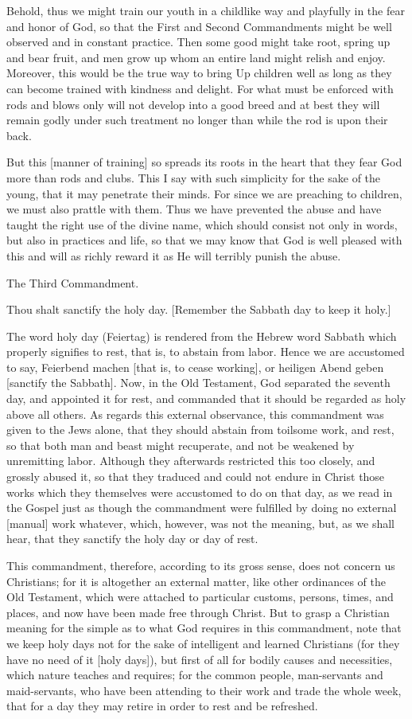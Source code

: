 Behold, thus we might train our youth in a childlike way and playfully
in the fear and honor of God, so that the First and Second Commandments
might be well observed and in constant practice. Then some good might
take root, spring up and bear fruit, and men grow up whom an entire
land might relish and enjoy. Moreover, this would be the true way to
bring Up children well as long as they can become trained with kindness
and delight. For what must be enforced with rods and blows only will
not develop into a good breed and at best they will remain godly under
such treatment no longer than while the rod is upon their back.

But this [manner of training] so spreads its roots in the heart that
they fear God more than rods and clubs. This I say with such
simplicity for the sake of the young, that it may penetrate their
minds. For since we are preaching to children, we must also prattle
with them. Thus we have prevented the abuse and have taught the right
use of the divine name, which should consist not only in words, but
also in practices and life, so that we may know that God is well
pleased with this and will as richly reward it as He will terribly
punish the abuse.

The Third Commandment.

Thou shalt sanctify the holy day.
[Remember the Sabbath day to keep it holy.]


The word holy day (Feiertag) is rendered from the Hebrew word Sabbath
which properly signifies to rest, that is, to abstain from labor. Hence
we are accustomed to say, Feierbend machen [that is, to cease working],
or heiligen Abend geben [sanctify the Sabbath]. Now, in the Old
Testament, God separated the seventh day, and appointed it for rest,
and commanded that it should be regarded as holy above all others. As
regards this external observance, this commandment was given to the
Jews alone, that they should abstain from toilsome work, and rest, so
that both man and beast might recuperate, and not be weakened by
unremitting labor. Although they afterwards restricted this too
closely, and grossly abused it, so that they traduced and could not
endure in Christ those works which they themselves were accustomed to
do on that day, as we read in the Gospel just as though the commandment
were fulfilled by doing no external [manual] work whatever, which,
however, was not the meaning, but, as we shall hear, that they sanctify
the holy day or day of rest.

This commandment, therefore, according to its gross sense, does not
concern us Christians; for it is altogether an external matter, like
other ordinances of the Old Testament, which were attached to
particular customs, persons, times, and places, and now have been made
free through Christ. But to grasp a Christian meaning for the simple as
to what God requires in this commandment, note that we keep holy days
not for the sake of intelligent and learned Christians (for they have
no need of it [holy days]), but first of all for bodily causes and
necessities, which nature teaches and requires; for the common people,
man-servants and maid-servants, who have been attending to their work
and trade the whole week, that for a day they may retire in order to
rest and be refreshed.

